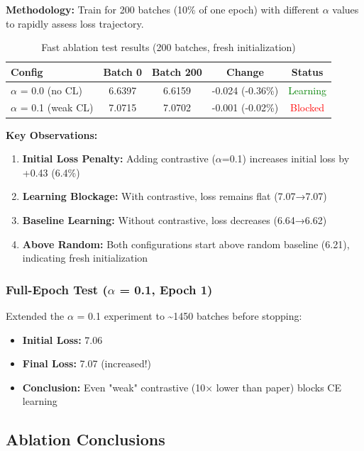 \documentclass[12pt,a4paper]{article}
\begin{document}
\textbf{Methodology:} Train for 200 batches (10\% of one epoch) with different $\alpha$ values to rapidly assess loss trajectory.

\begin{table}[H]
\centering
\begin{tabular}{lcccc}
\toprule
\textbf{Config} & \textbf{Batch 0} & \textbf{Batch 200} & \textbf{Change} & \textbf{Status} \\
\midrule
$\alpha$ = 0.0 (no CL) & 6.6397 & 6.6159 & -0.024 (-0.36\%) & \textcolor{green}{Learning} \\
$\alpha$ = 0.1 (weak CL) & 7.0715 & 7.0702 & -0.001 (-0.02\%) & \textcolor{red}{Blocked} \\
\bottomrule
\end{tabular}
\caption{Fast ablation test results (200 batches, fresh initialization)}
\end{table}

\textbf{Key Observations:}
\begin{enumerate}
    \item \textbf{Initial Loss Penalty:} Adding contrastive ($\alpha$=0.1) increases initial loss by +0.43 (6.4\%)
    \item \textbf{Learning Blockage:} With contrastive, loss remains flat (7.07→7.07)
    \item \textbf{Baseline Learning:} Without contrastive, loss decreases (6.64→6.62)
    \item \textbf{Above Random:} Both configurations start above random baseline (6.21), indicating fresh initialization
\end{enumerate}

\subsubsection{Full-Epoch Test ($\alpha$ = 0.1, Epoch 1)}

Extended the $\alpha$ = 0.1 experiment to \textasciitilde1450 batches before stopping:

\begin{itemize}
    \item \textbf{Initial Loss:} 7.06
    \item \textbf{Final Loss:} 7.07 (increased!)
    \item \textbf{Conclusion:} Even "weak" contrastive (10× lower than paper) blocks CE learning
\end{itemize}

\subsection{Ablation Conclusions}
\end{document}
